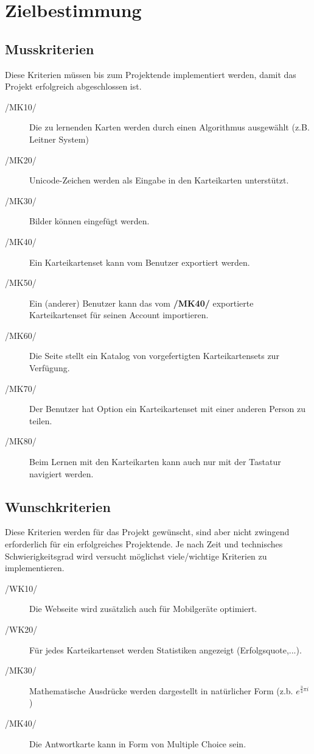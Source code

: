 \section{Zielbestimmung}

\subsection{Musskriterien}
Diese Kriterien müssen bis zum Projektende implementiert werden, damit das Projekt erfolgreich abgeschlossen ist.

\begin{description}
	\item[/MK10/] Die zu lernenden Karten werden durch einen Algorithmus ausgewählt (z.B. Leitner System)
	\item[/MK20/] Unicode-Zeichen werden als Eingabe in den Karteikarten unterstützt.
	\item[/MK30/] Bilder können eingefügt werden.
	\item[/MK40/] Ein Karteikartenset kann vom Benutzer exportiert werden.
	\item[/MK50/] Ein (anderer) Benutzer kann das vom \textbf{/MK40/} exportierte Karteikartenset für seinen Account importieren.
	\item[/MK60/] Die Seite stellt ein Katalog von vorgefertigten Karteikartensets zur Verfügung.
	\item[/MK70/] Der Benutzer hat Option ein Karteikartenset mit einer anderen Person zu teilen.
	\item[/MK80/] Beim Lernen mit den Karteikarten kann auch nur mit der Tastatur navigiert werden.
\end{description}

\subsection{Wunschkriterien}
Diese Kriterien werden für das Projekt gewünscht, sind aber nicht zwingend erforderlich für ein erfolgreiches Projektende. Je nach Zeit und technisches Schwierigkeitsgrad wird versucht möglichst viele/wichtige Kriterien zu implementieren.

\begin{description}
	\item[/WK10/] Die Webseite wird zusätzlich auch für Mobilgeräte optimiert.
	\item[/WK20/] Für jedes Karteikartenset werden Statistiken angezeigt (Erfolgsquote,...).
	\item[/MK30/] Mathematische Ausdrücke werden dargestellt in natürlicher Form (z.b. \( e^{\frac{3}{4}\pi i}\))
	\item[/MK40/] Die Antwortkarte kann in Form von Multiple Choice sein.
\end{description}

